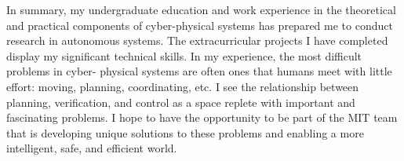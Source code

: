 \documentclass[]{letter}
\begin{document}
In summary, my undergraduate education and work experience in the theoretical and practical components of cyber-physical systems has prepared me to conduct research in autonomous systems. The extracurricular projects I have completed display my significant technical skills. In my experience, the most difficult problems in cyber- physical systems are often ones that humans meet with little effort: moving, planning, coordinating, etc. I see the relationship between planning, verification, and control as a space replete with important and fascinating problems. I hope to have the opportunity to be part of the MIT team that is developing unique solutions to these problems and enabling a more intelligent, safe, and efficient world.

\begin{comment}
{\bf \emph{References}}

[1] "Cyber-Physical Systems." Baheti and Gill

[2] "Optimization and Control of Cyber-Physical Vehicle Systems." Bradley and Atkins

\end{comment}
\end{document}
